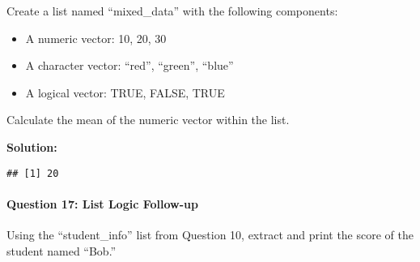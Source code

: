 \documentclass[
]{article}
\newenvironment{Shaded}{\begin{snugshade}}{\end{snugshade}}
\newcommand{\AttributeTok}[1]{\textcolor[rgb]{0.13,0.29,0.53}{#1}}
\newcommand{\CommentTok}[1]{\textcolor[rgb]{0.56,0.35,0.01}{\textit{#1}}}
\newcommand{\ConstantTok}[1]{\textcolor[rgb]{0.56,0.35,0.01}{#1}}
\newcommand{\DecValTok}[1]{\textcolor[rgb]{0.00,0.00,0.81}{#1}}
\newcommand{\FunctionTok}[1]{\textcolor[rgb]{0.13,0.29,0.53}{\textbf{#1}}}
\newcommand{\NormalTok}[1]{#1}
\newcommand{\OtherTok}[1]{\textcolor[rgb]{0.56,0.35,0.01}{#1}}
\newcommand{\SpecialCharTok}[1]{\textcolor[rgb]{0.81,0.36,0.00}{\textbf{#1}}}
\newcommand{\StringTok}[1]{\textcolor[rgb]{0.31,0.60,0.02}{#1}}
\begin{document}
Create a list named ``mixed\_data'' with the following components:

\begin{itemize}
\item
  A numeric vector: 10, 20, 30
\item
  A character vector: ``red'', ``green'', ``blue''
\item
  A logical vector: TRUE, FALSE, TRUE
\end{itemize}

Calculate the mean of the numeric vector within the list.

\textbf{Solution:}

\begin{Shaded}
\end{Shaded}

\begin{verbatim}
## [1] 20
\end{verbatim}

\hypertarget{question-17-list-logic-follow-up}{%
\paragraph{Question 17: List Logic
Follow-up}\label{question-17-list-logic-follow-up}}

Using the ``student\_info'' list from Question 10, extract and print the
score of the student named ``Bob.''
\end{document}
